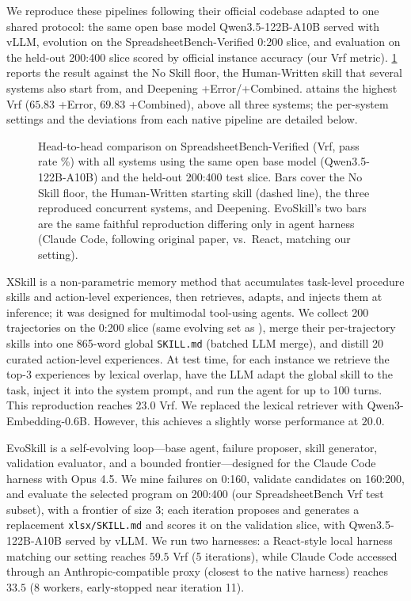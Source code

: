 We reproduce these pipelines following their official codebase adapted to one shared protocol: the same open base model Qwen3.5-122B-A10B served with vLLM, evolution on the SpreadsheetBench-Verified 0:200 slice, and evaluation on the held-out 200:400 slice scored by official instance accuracy (our Vrf metric).
\cref{fig:prior_systems} reports the result against the No Skill floor, the Human-Written skill that several systems also start from, and \systemname{} Deepening +Error/+Combined.
\systemname{} attains the highest Vrf ($65.83$ +Error, $69.83$ +Combined), above all three systems; the per-system settings and the deviations from each native pipeline are detailed below.

\begin{figure}[t]
    \centering
    \begingroup
    \setlength{\columnwidth}{0.90\linewidth}%
    
    \endgroup
    \caption{Head-to-head comparison on SpreadsheetBench-Verified (Vrf, pass rate \%) with all systems using the same open base model (Qwen3.5-122B-A10B) and the held-out 200:400 test slice. Bars cover the No Skill floor, the Human-Written starting skill (dashed line), the three reproduced concurrent systems, and \systemname{} Deepening. EvoSkill's two bars are the same faithful reproduction differing only in agent harness (Claude Code, following original paper, vs.\ React, matching our setting).}
    \label{fig:prior_systems}
\end{figure}

XSkill is a non-parametric memory method that accumulates task-level procedure skills and action-level experiences, then retrieves, adapts, and injects them at inference; it was designed for multimodal tool-using agents.
We collect 200 trajectories on the 0:200 slice (same evolving set as \systemname{}), merge their per-trajectory skills into one 865-word global \texttt{SKILL.md} (batched LLM merge), and distill 20 curated action-level experiences.
At test time, for each instance we retrieve the top-3 experiences by lexical overlap, have the LLM adapt the global skill to the task, inject it into the system prompt, and run the agent for up to 100 turns.
This reproduction reaches $23.0$ Vrf. We replaced the lexical retriever with Qwen3-Embedding-0.6B. However, this achieves a slightly worse performance at $20.0$.

EvoSkill is a self-evolving loop---base agent, failure proposer, skill generator, validation evaluator, and a bounded frontier---designed for the Claude Code harness with Opus 4.5.
We mine failures on 0:160, validate candidates on 160:200, and evaluate the selected program on 200:400 (our SpreadsheetBench Vrf test subset), with a frontier of size 3; each iteration proposes and generates a replacement \texttt{xlsx/SKILL.md} and scores it on the validation slice, with Qwen3.5-122B-A10B served by vLLM.
We run two harnesses: a React-style local harness matching our setting reaches $59.5$ Vrf (5 iterations), while Claude Code accessed through an Anthropic-compatible proxy (closest to the native harness) reaches $33.5$ (8 workers, early-stopped near iteration 11).

